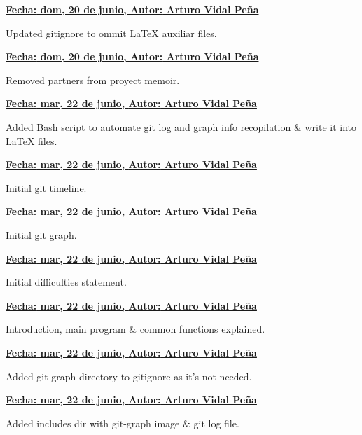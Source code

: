 \item \textbf{\underline{\underline{Fecha:} dom, 20 de junio, \underline{Autor:} Arturo Vidal Peña}}\\\item[] Updated gitignore to ommit LaTeX auxiliar files.\\
\item \textbf{\underline{\underline{Fecha:} dom, 20 de junio, \underline{Autor:} Arturo Vidal Peña}}\\\item[] Removed partners from proyect memoir.\\
\item \textbf{\underline{\underline{Fecha:} mar, 22 de junio, \underline{Autor:} Arturo Vidal Peña}}\\\item[] Added Bash script to automate git log and graph info recopilation \& write it into LaTeX files.\\
\item \textbf{\underline{\underline{Fecha:} mar, 22 de junio, \underline{Autor:} Arturo Vidal Peña}}\\\item[] Initial git timeline.\\
\item \textbf{\underline{\underline{Fecha:} mar, 22 de junio, \underline{Autor:} Arturo Vidal Peña}}\\\item[] Initial git graph.\\
\item \textbf{\underline{\underline{Fecha:} mar, 22 de junio, \underline{Autor:} Arturo Vidal Peña}}\\\item[] Initial difficulties statement.\\
\item \textbf{\underline{\underline{Fecha:} mar, 22 de junio, \underline{Autor:} Arturo Vidal Peña}}\\\item[] Introduction, main program \& common functions explained.\\
\item \textbf{\underline{\underline{Fecha:} mar, 22 de junio, \underline{Autor:} Arturo Vidal Peña}}\\\item[] Added git-graph directory to gitignore as it's not needed.\\
\item \textbf{\underline{\underline{Fecha:} mar, 22 de junio, \underline{Autor:} Arturo Vidal Peña}}\\\item[] Added includes dir with git-graph image \& git log file.\\
